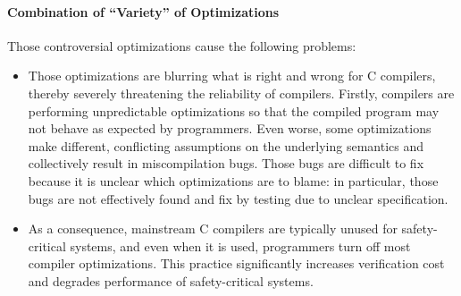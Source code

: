 \paragraph{Combination of ``Variety'' of Optimizations}







Those controversial optimizations cause the following problems:
%
\begin{itemize}
\item Those optimizations are blurring what is right and wrong for C compilers, thereby severely
  threatening the reliability of compilers.  Firstly, compilers are performing unpredictable
  optimizations so that the compiled program may not behave as expected by programmers.  Even worse,
  some optimizations make different, conflicting assumptions on the underlying semantics and
  collectively result in miscompilation bugs.  Those bugs are difficult to fix because it is unclear
  which optimizations are to blame: in particular, those bugs are not effectively found and fix by
  testing due to unclear specification.

\item As a consequence, mainstream C compilers are typically unused for safety-critical systems, and
  even when it is used, programmers turn off most compiler optimizations.  This practice
  significantly increases verification cost and degrades performance of safety-critical systems.
\end{itemize}

